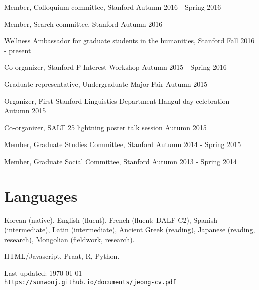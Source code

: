 \documentclass[letterpaper]{article}
\def\footerlink{https://sunwooj.github.io/documents/jeong-cv.pdf}
\renewenvironment{itemize}{
  \begin{list}{}{
    \setlength{\leftmargin}{1.5em}
  }
}{
  \end{list}
}
\begin{document}
\begin{itemize}\itemsep -1pt
\item Member, Colloquium committee, Stanford \hfill Autumn 2016 - Spring 2016
\item Member, Search committee, Stanford \hfill Autumn 2016
\item Wellness Ambassador for graduate students in the humanities, Stanford \hfill Fall 2016 - present
\item Co-organizer, Stanford P-Interest Workshop \hfill Autumn 2015 - Spring 2016
\item Graduate representative, Undergraduate Major Fair \hfill Autumn 2015
\item Organizer, First Stanford Linguistics Department Hangul day celebration \hfill Autumn 2015
\item Co-organizer, SALT 25 lightning poster talk session \hfill Autumn 2015
\item Member, Graduate Studies Committee, Stanford \hfill Autumn 2014 - Spring 2015
\item Member, Graduate Social Committee, Stanford \hfill Autumn 2013 - Spring 2014

\end{itemize}


\section*{Languages}

\begin{itemize}\itemsep -1pt
\item Korean (native), English (fluent), French (fluent: DALF C2), Spanish (intermediate), Latin (intermediate), Ancient Greek (reading), Japanese (reading, research), Mongolian (fieldwork, research).
\item HTML/Javascript, Praat, R, Python.
\end{itemize}

\bigskip

\begin{center}
  \begin{footnotesize}
    Last updated: \today \\
    \href{\footerlink}{\texttt{https://sunwooj.github.io/documents/jeong-cv.pdf}}
  \end{footnotesize}
\end{center}
\end{document}
